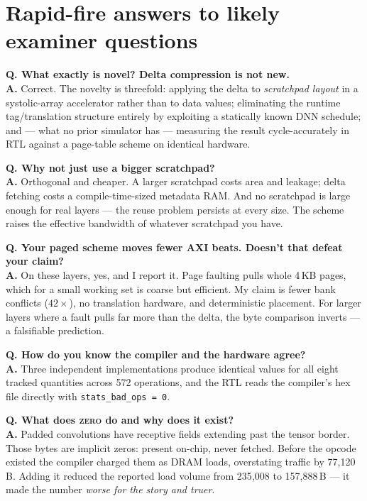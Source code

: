 \documentclass[11pt,a4paper]{article}
\newcommand{\op}[1]{\textsc{#1}}
\newcommand{\file}[1]{\texttt{\small #1}}
\begin{document}
\section{Rapid-fire answers to likely examiner questions}

\newcommand{\qa}[2]{\vspace{5pt}\noindent\textbf{\textcolor{stampblue}{Q.}
  #1}\\[2pt]\textbf{A.} #2\vspace{2pt}}

\qa{What exactly is novel? Delta compression is not new.}{
Correct. The novelty is threefold: applying the delta to \emph{scratchpad
layout} in a systolic-array accelerator rather than to data values; eliminating
the runtime tag/translation structure entirely by exploiting a statically known
DNN schedule; and --- what no prior simulator has --- measuring the result
cycle-accurately in RTL against a page-table scheme on identical hardware.}

\qa{Why not just use a bigger scratchpad?}{
Orthogonal and cheaper. A larger scratchpad costs area and leakage; delta
fetching costs a compile-time-sized metadata RAM. And no scratchpad is large
enough for real layers --- the reuse problem persists at every size. The scheme
raises the effective bandwidth of whatever scratchpad you have.}

\qa{Your paged scheme moves fewer AXI beats. Doesn't that defeat your claim?}{
On these layers, yes, and I report it. Page faulting pulls whole 4\,KB pages,
which for a small working set is coarse but efficient. My claim is fewer bank
conflicts ($42\times$), no translation hardware, and deterministic placement.
For larger layers where a fault pulls far more than the delta, the byte
comparison inverts --- a falsifiable prediction.}

\qa{How do you know the compiler and the hardware agree?}{
Three independent implementations produce identical values for all eight tracked
quantities across 572 operations, and the RTL reads the compiler's hex file
directly with \file{stats\_bad\_ops = 0}.}

\qa{What does \op{zero} do and why does it exist?}{
Padded convolutions have receptive fields extending past the tensor border.
Those bytes are implicit zeros: present on-chip, never fetched. Before the
opcode existed the compiler charged them as DRAM loads, overstating traffic by
77{,}120\,B. Adding it reduced the reported load volume from 235{,}008 to
157{,}888\,B --- it made the number \emph{worse for the story and truer}.}
\end{document}
